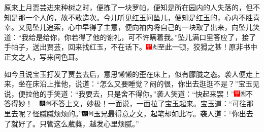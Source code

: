 原来上月贾芸进来种树之时，便拣了一块罗帕，便知是所在园内的人失落的，但不知是那一个人的，故不敢造次。今儿听见红玉问坠儿，便知是红玉的，心内不胜喜幸。又见坠儿追索，心中早得了主意，便向袖内将自己的一块取了出来，向坠儿笑道：“我给是给你，你若得了他的谢礼，可不许瞒着我。”坠儿满口里答应了，接了手帕子，送出贾芸，回来找红玉，不在话下。{\includegraphics[width=3mm]{../Images/00002}\includegraphics[width=3mm]{../Images/00012}\footnotesize \kaishu 至此一顿，狡猾之甚！原非书中正文之人，写来间色耳。}

如今且说宝玉打发了贾芸去后，意思懒懒的歪在床上，似有朦胧之态。袭人便走上来，坐在床沿上推他，说道：“怎么又要睡觉？闷的很，你出去逛逛不是？”宝玉见说，便拉他的手笑道：“我要去，只是舍不得你。”袭人笑道：“快起来罢！”{\includegraphics[width=3mm]{../Images/00002}\includegraphics[width=3mm]{../Images/00011}\footnotesize \kaishu 不答得妙！　\includegraphics[width=3mm]{../Images/00004}\includegraphics[width=3mm]{../Images/00011}\footnotesize \kaishu 不答上文，妙极！}一面说，一面拉了宝玉起来。宝玉道：“可往那里去呢？怪腻腻烦烦的。”{\includegraphics[width=3mm]{../Images/00004}\includegraphics[width=3mm]{../Images/00011}\footnotesize \kaishu 玉兄最得意之文，起笔却如此写。}袭人道：“你出去了就好了。只管这么葳蕤，越发心里烦腻。”

